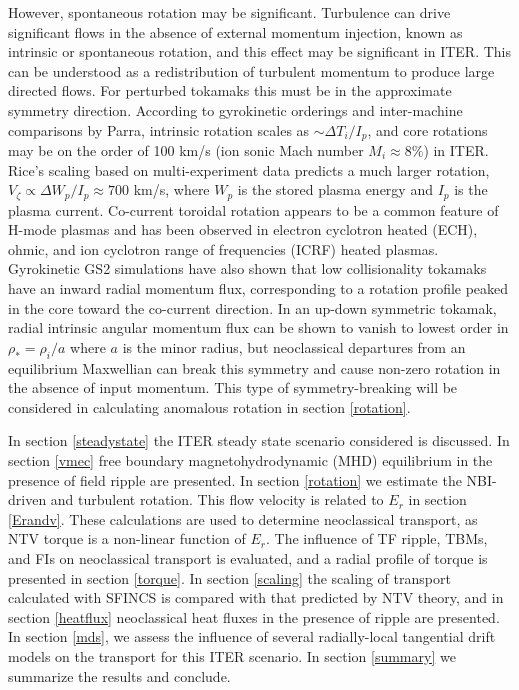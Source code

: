 \documentclass[aip, pop, preprint]{revtex4-1}
\numberwithin{figure}{section}
\numberwithin{equation}{section}
\begin{document}
However, spontaneous rotation may be significant. Turbulence can drive significant flows in the absence of external momentum injection, known as intrinsic or spontaneous rotation, and this effect may be significant in ITER. This can be understood as a redistribution of turbulent momentum to produce large directed flows. For perturbed tokamaks this must be in the approximate symmetry direction. According to gyrokinetic orderings and inter-machine comparisons by Parra,\cite{Parra2012} intrinsic rotation scales as $\sim \Delta T_i/I_p$, and core rotations may be on the order of 100 km/s (ion sonic Mach number $M_i \approx 8\%$) in ITER. Rice's scaling based on multi-experiment data \cite{Rice2007} predicts a much larger rotation, $V_{\zeta} \propto \Delta W_p/I_p \approx 700$ km/s, where $W_p$ is the stored plasma energy and $I_p$ is the plasma current. Co-current toroidal rotation appears to be a common feature of H-mode plasmas and has been observed in electron cyclotron heated (ECH),\cite{DeGrassie2007} ohmic,\cite{DeGrassie2007} and ion cyclotron range of frequencies (ICRF) \cite{Noterdaeme2003} heated plasmas. Gyrokinetic GS2 simulations have also shown that low collisionality tokamaks have an inward radial momentum flux, corresponding to a rotation profile peaked in the core toward the co-current direction.\cite{Barnes2013} In an up-down symmetric tokamak, radial intrinsic angular momentum flux can be shown to vanish to lowest order in $\rho_* = \rho_i/a$ where $a$ is the minor radius, but neoclassical departures from an equilibrium Maxwellian can break this symmetry and cause non-zero rotation in the absence of input momentum.\cite{Barnes2013} This type of symmetry-breaking will be considered in calculating anomalous rotation in section \ref{rotation}. 

In section \ref{steadystate} the ITER steady state scenario considered is discussed. In section \ref{vmec} free boundary magnetohydrodynamic (MHD) equilibrium in the presence of field ripple are presented. In section \ref{rotation} we estimate the NBI-driven and turbulent rotation. This flow velocity is related to $E_r$ in section \ref{Erandv}. These calculations are used to determine neoclassical transport, as NTV torque is a non-linear function of $E_r$. The influence of TF ripple, TBMs, and FIs on neoclassical transport is evaluated, and a radial profile of torque is presented in section \ref{torque}. In section \ref{scaling} the scaling of transport calculated with SFINCS is compared with that predicted by NTV theory, and in section \ref{heatflux} neoclassical heat fluxes in the presence of ripple are presented. In section \ref{mds}, we assess the influence of several radially-local tangential drift models on the transport for this ITER scenario. In section \ref{summary} we summarize the results and conclude.
\end{document}
